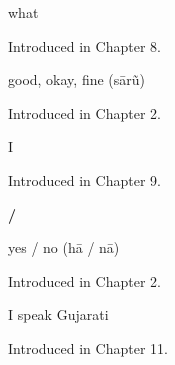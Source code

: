 \noindent\begin{minipage}[t]{\linewidth}
\raggedright
\textbf{}\par
\small what\par
\footnotesize Introduced in Chapter 8.
\end{minipage}\par\medskip

\noindent\begin{minipage}[t]{\linewidth}
\raggedright
\textbf{}\par
\small good, okay, fine (sārũ)\par
\footnotesize Introduced in Chapter 2.
\end{minipage}\par\medskip

\noindent\begin{minipage}[t]{\linewidth}
\raggedright
\textbf{}\par
\small I\par
\footnotesize Introduced in Chapter 9.
\end{minipage}\par\medskip

\noindent\begin{minipage}[t]{\linewidth}
\raggedright
\textbf{ / }\par
\small yes / no (hā / nā)\par
\footnotesize Introduced in Chapter 2.
\end{minipage}\par\medskip

\noindent\begin{minipage}[t]{\linewidth}
\raggedright
\textbf{   }\par
\small I speak Gujarati\par
\footnotesize Introduced in Chapter 11.
\end{minipage}\par\medskip
